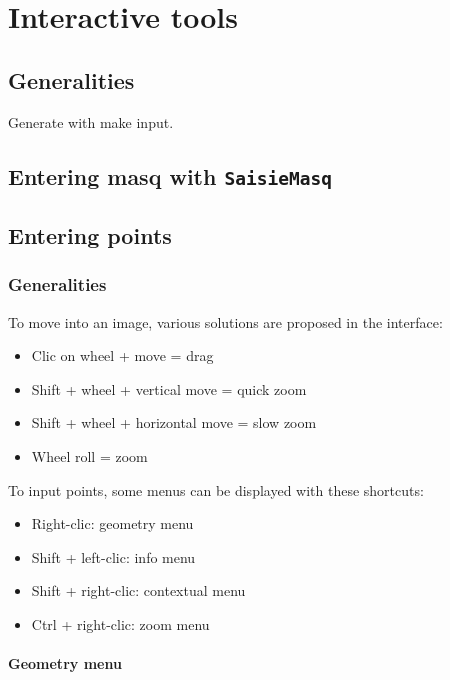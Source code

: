\chapter{Interactive tools}

\section{Generalities}

Generate with make input.

\section{Entering masq with {\tt SaisieMasq}}



\section{Entering points}

\subsection{Generalities}


To move into an image, various solutions are proposed in the interface:
\begin{itemize}
\item Clic on wheel + move = drag
\item Shift + wheel + vertical move = quick zoom
\item Shift + wheel + horizontal move = slow zoom
\item Wheel roll = zoom
\end{itemize}

\vspace{\baselineskip}
To input points, some menus can be displayed with these shortcuts:
\begin{itemize}
\item Right-clic: geometry menu
\item Shift + left-clic: info menu
\item Shift + right-clic: contextual menu
\item Ctrl + right-clic: zoom menu
\end{itemize}

\subsubsection{Geometry menu}

